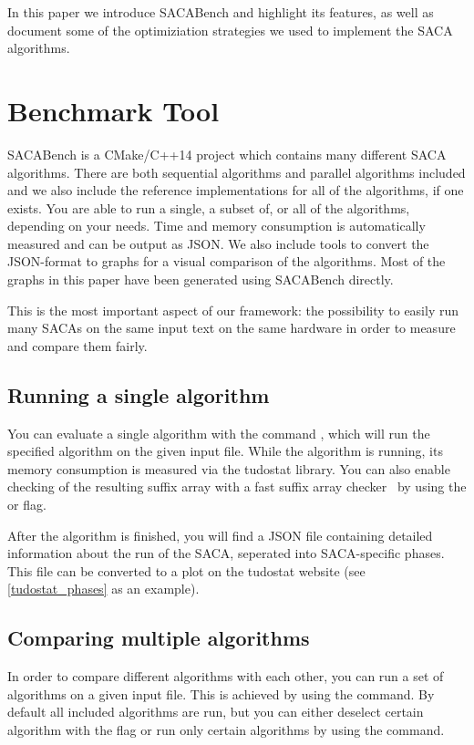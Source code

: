 In this paper we introduce SACABench and highlight its features,
as well as document some of the optimiziation strategies we used to implement the SACA algorithms.

\section{Benchmark Tool}

SACABench is a CMake/C++14 project which contains many different SACA algorithms.
There are both sequential algorithms and parallel algorithms included
and we also include the reference implementations for all of the algorithms, if one exists.
You are able to run a single, a subset of, or all of the algorithms, depending on your needs.
Time and memory consumption is automatically measured and can be output as JSON.
We also include tools to convert the JSON-format to graphs for a visual comparison of the algorithms.
Most of the graphs in this paper have been generated using SACABench directly.

This is the most important aspect of our framework:
the possibility to easily run many SACAs on the same input text on the same hardware
in order to measure and compare them fairly.

\subsection{Running a single algorithm}

You can evaluate a single algorithm with the command ,
which will run the specified algorithm on the given input file.
While the algorithm is running, its memory consumption is measured via the tudostat library.
You can also enable checking of the resulting suffix array with a fast suffix array checker~\cite{saca:11} by
using the  or  flag.

After the algorithm is finished, you will find a JSON file containing detailed information about
the run of the SACA, seperated into SACA-specific phases.
This file can be converted to a plot on the tudostat website (see \cref{tudostat_phases} as an example).

\subsection{Comparing multiple algorithms}

In order to compare different algorithms with each other, you can run a set of algorithms on a given input file.
This is achieved by using the  command.
By default all included algorithms are run, but you can either deselect certain
algorithm with the  flag or run only certain
algorithms by using the  command.

